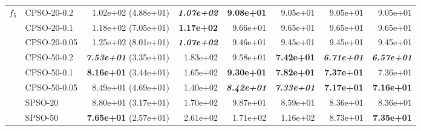 \documentclass[a4paper,twoside]{article}
\begin{document}
\begin{table}
\begin{tabular}{|| l | l | r | r | r | r | r | r ||}
$f_5$   &  CPSO-20-0.2    &  1.02e+02 (4.88e+01)               &  {\bf \emph{1.07e+02}}  &  {\bf 9.08e+01}         &  9.05e+01               &  9.05e+01               &  9.05e+01 \\
    \cline{2-8} 
        &  CPSO-20-0.1    &  1.18e+02 (7.05e+01)               &  {\bf 1.17e+02}         &  9.66e+01               &  9.65e+01               &  9.65e+01               &  9.65e+01 \\
    \cline{2-8}
        &  CPSO-20-0.05   &  1.25e+02 (8.01e+01)               &  {\bf \emph{1.07e+02}}  &  9.46e+01               &  9.45e+01               &  9.45e+01               &  9.45e+01 \\
    \cline{2-8}
        &  CPSO-50-0.2    &  {\bf \emph{7.53e+01}} (3.35e+01)  &  1.83e+02               &  9.58e+01               &  {\bf 7.42e+01}         &  {\bf \emph{6.71e+01}}  &  {\bf \emph{6.57e+01}} \\
    \cline{2-8}
        &  CPSO-50-0.1    &  {\bf 8.16e+01} (3.44e+01)         &  1.65e+02               &  {\bf 9.30e+01}         &  {\bf 7.82e+01}         &  {\bf 7.37e+01}         &  7.36e+01 \\
    \cline{2-8}
        &  CPSO-50-0.05   &  8.49e+01 (4.69e+01)               &  1.40e+02               &  {\bf \emph{8.42e+01}}  &  {\bf \emph{7.33e+01}}  &  {\bf 7.17e+01}         &  {\bf 7.16e+01} \\
\hline \hline
        &  SPSO-20        &  8.80e+01 (3.17e+01)               &  1.70e+02               &  9.87e+01               &  8.59e+01               &  8.36e+01               &  8.36e+01 \\
    \cline{2-8}
        &  SPSO-50        &  {\bf 7.65e+01} (2.57e+01)         &  2.61e+02               &  1.71e+02               &  1.16e+02               &  8.73e+01               &  {\bf 7.35e+01} \\

\hline \hline \hline







\end{tabular}
\end{table}
\end{document}
